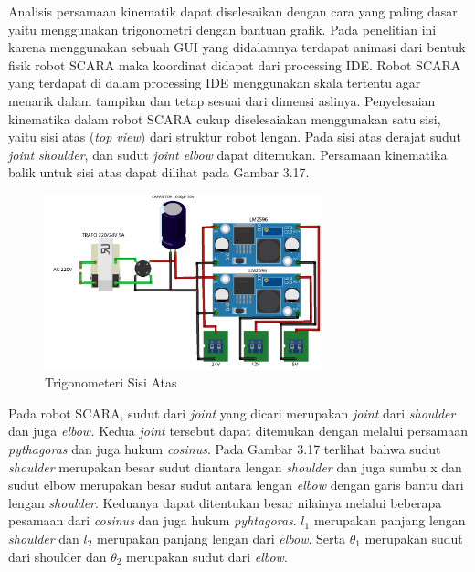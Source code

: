 Analisis persamaan kinematik dapat diselesaikan dengan cara yang paling dasar yaitu menggunakan trigonometri dengan bantuan grafik. Pada penelitian ini karena menggunakan sebuah GUI yang didalamnya terdapat animasi dari bentuk fisik robot SCARA maka koordinat didapat dari processing IDE. Robot SCARA yang terdapat di dalam processing IDE menggunakan skala tertentu agar menarik dalam tampilan dan tetap sesuai dari dimensi aslinya. Penyelesaian kinematika dalam robot SCARA cukup diselesaiakan menggunakan satu sisi, yaitu sisi atas (\textit{top view}) dari struktur robot lengan. Pada sisi atas derajat sudut \textit{joint} \textit{shoulder}, dan sudut \textit{joint elbow} dapat ditemukan. Persamaan kinematika balik untuk sisi atas dapat dilihat pada Gambar 3.17.
\begin{figure}[H]
	\centering
	\includegraphics[width=8cm]{gambar/catudaya_bb.png}
	\caption{Trigonometeri Sisi Atas}
	\label{g_ik}
\end{figure}
 
 
Pada robot SCARA, sudut dari \textit{joint} yang dicari merupakan \textit{joint} dari \textit{shoulder} dan juga \textit{elbow.} Kedua \textit{joint} tersebut dapat ditemukan dengan melalui persamaan \textit{pythagoras} dan juga hukum \textit{cosinus}. Pada Gambar 3.17 terlihat bahwa sudut \textit{shoulder} merupakan besar sudut diantara lengan \textit{shoulder} dan juga sumbu x dan sudut elbow merupakan besar sudut antara lengan \textit{elbow} dengan garis bantu dari lengan \textit{shoulder}. Keduanya dapat ditentukan besar nilainya melalui beberapa pesamaan dari \textit{cosinus} dan juga hukum \textit{pyhtagoras}. $l_{1}$ merupakan panjang lengan \textit{shoulder} dan $l_{2}$ merupakan panjang lengan dari \textit{elbow}. Serta $\theta_{1}$ merupakan sudut dari shoulder dan $\theta_{2}$ merupakan sudut dari \textit{elbow}.  

